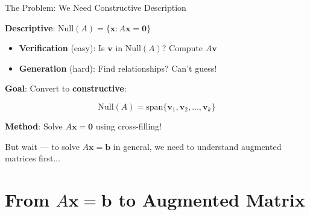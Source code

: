 \documentclass[10pt]{beamer}
\theoremstyle{definition}
\newcommand{\x}[1]{\alert{\textbf{#1}}}
\begin{document}
\begin{frame}{The Problem: We Need Constructive Description}

\x{Descriptive}: $\text{Null}(A) = \{\mathbf{x} : A\mathbf{x} = \mathbf{0}\}$

\begin{itemize}
\item \textbf{Verification} (easy): Is $\mathbf{v}$ in $\text{Null}(A)$? Compute $A\mathbf{v}$
\item \textbf{Generation} (hard): Find relationships? Can't guess!
\end{itemize}

\vspace{1em}

\x{Goal}: Convert to \textbf{constructive}:

$$\text{Null}(A) = \text{span}\{\mathbf{v}_1, \mathbf{v}_2, \ldots, \mathbf{v}_k\}$$

\vspace{0.5em}

\x{Method}: Solve $A\mathbf{x} = \mathbf{0}$ using cross-filling!

\vspace{0.5em}

But wait — to solve $A\mathbf{x} = \mathbf{b}$ in general, we need to understand augmented matrices first$\ldots$

\end{frame}

\section{From $A\mathbf{x} = \mathbf{b}$ to Augmented Matrix}
\end{document}
